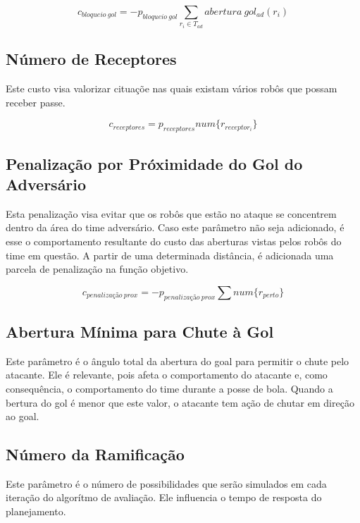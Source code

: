 \begin{dmath}
   c_{bloqueio{\ }gol} = - p_{bloqueio{\ }gol}
    \sum_{r_i \in T_{ad}} abertura{\ }gol_{ad}(r_i)
\end{dmath}

\subsection{Número de Receptores}

Este custo visa valorizar cituaçõe nas quais existam
vários robôs que possam receber passe.

\begin{dmath}
  c_{receptores} = p_{receptores}
   num \lbrace r_{receptor_i} \rbrace
\end{dmath}

\subsection{Penalização por Próximidade do Gol do Adversário}
Esta penalização visa evitar que os robôs que estão no ataque
se concentrem dentro da área do time adversário. Caso este
parâmetro não seja adicionado, é esse o comportamento resultante
do custo das aberturas vistas pelos robôs do time em questão. 
A partir de uma determinada distância, é adicionada uma parcela
de penalização na função objetivo.

\begin{dmath}
  c_{penalização{\ }prox} = - p_{penalização{\ }prox}
    \sum num \lbrace r_{perto} \rbrace
\end{dmath}

\subsection{Abertura Mínima para Chute à Gol}
Este parâmetro é o ângulo total da abertura do goal para permitir
o chute pelo atacante. Ele é relevante, pois afeta o comportamento
do atacante e, como consequência, o comportamento do time durante
a posse de bola. Quando a bertura do gol é menor que este valor, o
atacante tem ação de chutar em direção ao goal.


\subsection{Número da Ramificação}
Este parâmetro é o número de possibilidades que serão simulados
em cada iteração do algorítmo de avaliação. Ele influencia o
tempo de resposta do planejamento.
